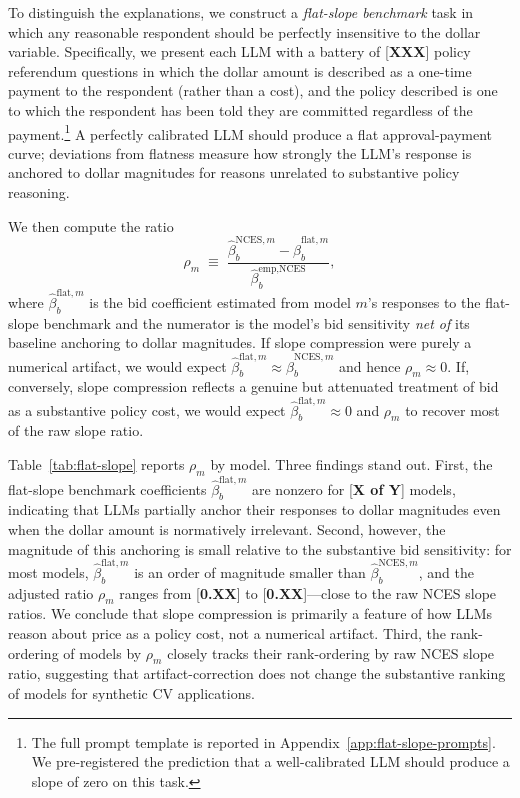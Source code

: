 \documentclass[12pt]{article}
\begin{document}
To distinguish the explanations, we construct a \emph{flat-slope benchmark} task in which any reasonable respondent should be perfectly insensitive to the dollar variable. Specifically, we present each LLM with a battery of [\textbf{XXX}] policy referendum questions in which the dollar amount is described as a one-time payment to the respondent (rather than a cost), and the policy described is one to which the respondent has been told they are committed regardless of the payment.\footnote{The full prompt template is reported in Appendix~\ref{app:flat-slope-prompts}. We pre-registered the prediction that a well-calibrated LLM should produce a slope of zero on this task.} A perfectly calibrated LLM should produce a flat approval-payment curve; deviations from flatness measure how strongly the LLM's response is anchored to dollar magnitudes for reasons unrelated to substantive policy reasoning.

We then compute the ratio
\begin{equation}
    \rho_m \;\equiv\; \frac{\hat{\beta}_b^{\text{NCES}, m} - \hat{\beta}_b^{\text{flat}, m}}{\hat{\beta}_b^{\text{emp,NCES}}},
    \label{eq:rho}
\end{equation}
where $\hat{\beta}_b^{\text{flat}, m}$ is the bid coefficient estimated from model $m$'s responses to the flat-slope benchmark and the numerator is the model's bid sensitivity \emph{net of} its baseline anchoring to dollar magnitudes. If slope compression were purely a numerical artifact, we would expect $\hat{\beta}_b^{\text{flat}, m} \approx \hat{\beta}_b^{\text{NCES}, m}$ and hence $\rho_m \approx 0$. If, conversely, slope compression reflects a genuine but attenuated treatment of bid as a substantive policy cost, we would expect $\hat{\beta}_b^{\text{flat}, m} \approx 0$ and $\rho_m$ to recover most of the raw slope ratio.

Table~\ref{tab:flat-slope} reports $\rho_m$ by model. Three findings stand out. First, the flat-slope benchmark coefficients $\hat{\beta}_b^{\text{flat}, m}$ are nonzero for [\textbf{X of Y}] models, indicating that LLMs partially anchor their responses to dollar magnitudes even when the dollar amount is normatively irrelevant. Second, however, the magnitude of this anchoring is small relative to the substantive bid sensitivity: for most models, $\hat{\beta}_b^{\text{flat}, m}$ is an order of magnitude smaller than $\hat{\beta}_b^{\text{NCES}, m}$, and the adjusted ratio $\rho_m$ ranges from [\textbf{0.XX}] to [\textbf{0.XX}]---close to the raw NCES slope ratios. We conclude that slope compression is primarily a feature of how LLMs reason about price as a policy cost, not a numerical artifact. Third, the rank-ordering of models by $\rho_m$ closely tracks their rank-ordering by raw NCES slope ratio, suggesting that artifact-correction does not change the substantive ranking of models for synthetic CV applications.
\end{document}

